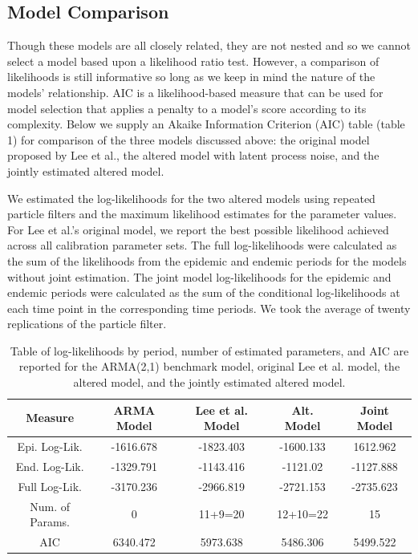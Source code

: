 \documentclass[12pt]{article}
\begin{document}
\subsection{Model Comparison}

  Though these models are all closely related, they are not nested and so we cannot select a model based upon a likelihood ratio test. However, a comparison of likelihoods is still informative so long as we keep in mind the nature of the models' relationship. AIC is a likelihood-based measure that can be used for model selection that applies a penalty to a model's score according to its complexity. Below we supply an Akaike Information Criterion (AIC) table (table 1) for comparison of the three models discussed above: the original model proposed by Lee et al., the altered model with latent process noise, and the jointly estimated altered model. 

  We estimated the log-likelihoods for the two altered models using repeated particle filters and the maximum likelihood estimates for the parameter values. For Lee et al.'s original model, we report the best possible likelihood achieved across all calibration parameter sets. The full log-likelihoods were calculated as the sum of the likelihoods from the epidemic and endemic periods for the models without joint estimation. The joint model log-likelihoods for the epidemic and endemic periods were calculated as the sum of the conditional log-likelihoods at each time point in the corresponding time periods. We took the average of twenty replications of the particle filter. 
        \begin{table}[H]
        \caption{Table of log-likelihoods by period, number of estimated parameters, and AIC are reported for the ARMA(2,1) benchmark model, original Lee et al. model, the altered model, and the jointly estimated altered model.}
        \begin{center}
        \begin{tabular}{||c | c c c c||}
         \hline
         Measure & ARMA Model & Lee et al. Model & Alt. Model & Joint Model \\ [0.5ex]
         \hline\hline
         Epi. Log-Lik. & -1616.678 & -1823.403 & -1600.133 & 1612.962 \\
         \hline
         End. Log-Lik. & -1329.791 & -1143.416 & -1121.02 & -1127.888 \\
         \hline
         Full Log-Lik. & -3170.236 & -2966.819 & -2721.153 & -2735.623 \\
         \hline
         Num. of Params. & 0 & 11+9=20 & 12+10=22 & 15 \\
         \hline
         AIC & 6340.472 & 5973.638 & 5486.306 & 5499.522 \\
         \hline
        \end{tabular}
        \end{center}
        \end{table}
        
\end{document}
